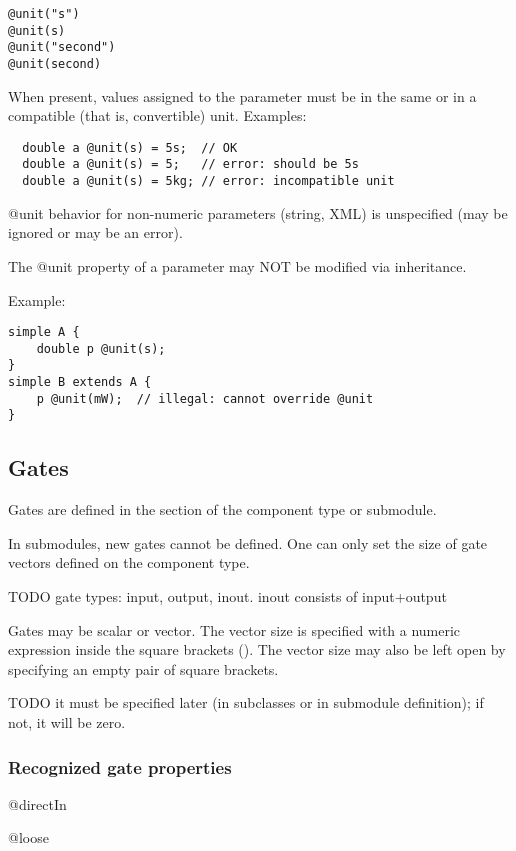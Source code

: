 \begin{verbatim}
@unit("s")
@unit(s)
@unit("second")
@unit(second)
\end{verbatim}

When present, values assigned to the parameter must be in the
same or in a compatible (that is, convertible) unit.
Examples:

\begin{verbatim}
  double a @unit(s) = 5s;  // OK
  double a @unit(s) = 5;   // error: should be 5s
  double a @unit(s) = 5kg; // error: incompatible unit
\end{verbatim}

@unit behavior for non-numeric parameters (string, XML) is unspecified
(may be ignored or may be an error).

The @unit property of a parameter may NOT be modified via inheritance.

Example:
\begin{verbatim}
simple A {
    double p @unit(s);
}
simple B extends A {
    p @unit(mW);  // illegal: cannot override @unit
}
\end{verbatim}



\subsection{Gates}
\label{ch-ned-ref:sec:gates}

Gates are defined in the  section of the component type
or submodule.

In submodules, new gates cannot be defined. One can only set the size
of gate vectors defined on the component type.

TODO gate types: input, output, inout. inout consists of input+output

Gates may be scalar or vector. The vector size is specified with a
numeric expression inside the square brackets (\ttt{[...]}).
The vector size may also be left open by specifying an empty pair
of square brackets.

TODO it must be specified later (in subclasses or in submodule definition);
if not, it will be zero.


\subsubsection{Recognized gate properties}

@directIn

@loose



